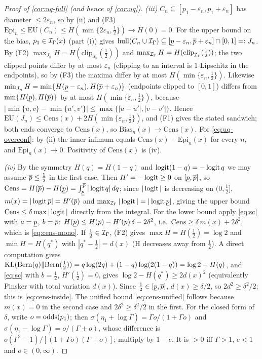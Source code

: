 \begin{proof}[Proof of \cref{cor:uq-full} (and hence of \cref{cor:uq})]
\emph{(iii)} $C_n\subseteq[p_1-\varepsilon_n,p_1+\varepsilon_n]$ has diameter
$\le2\varepsilon_n$, so by (ii) and (F3)
$\mathrm{Epi}_n\le\mathrm{EU}(C_n)\le H(\min\{2\varepsilon_n,\tfrac12\})\to H(0)=0$.
For the upper bound on the bias, $p_1\in\mathcal{I}_\Gamma(x)$ (part (i)) gives
$\mathrm{hull}(C_n\cup\mathcal{I}_\Gamma)\subseteq[\underline{p}-\varepsilon_n,\overline{p}+\varepsilon_n]\cap[0,1]=:J_n$.
By (F2) $\max_{J_n}H=H(\mathrm{clip}_{J_n}(\tfrac12))$ and
$\max_{\mathcal{I}_\Gamma}H=H(\mathrm{clip}_{\mathcal{I}_\Gamma}(\tfrac12))$; the two clipped points differ by
at most $\varepsilon_n$ (clipping to an interval is $1$-Lipschitz in the endpoints), so by
(F3) the maxima differ by at most $H(\min\{\varepsilon_n,\tfrac12\})$. Likewise
$\min_{J_n}H=\min\{H(\underline{p}-\varepsilon_n),H(\overline{p}+\varepsilon_n)\}$ (endpoints clipped to
$[0,1]$) differs from $\min\{H(\underline{p}),H(\overline{p})\}$ by at most $H(\min\{\varepsilon_n,\tfrac12\})$,
because $|\min\{u,v\}-\min\{u',v'\}|\le\max\{|u-u'|,|v-v'|\}$. Hence
$\mathrm{EU}(J_n)\le\mathrm{Cens}(x)+2H(\min\{\varepsilon_n,\tfrac12\})$, and (F1) gives the
stated sandwich; both ends converge to $\mathrm{Cens}(x)$, so
$\mathrm{Bias}_n(x)\to\mathrm{Cens}(x)$. For \eqref{eq:uq-overconf}: by (ii) the inner
infimum equals $\mathrm{Cens}(x)-\mathrm{Epi}_n(x)$ for every $n$, and
$\mathrm{Epi}_n(x)\to0$. Positivity of $\mathrm{Cens}(x)$ is (iv).

\emph{(iv)} By the symmetry $H(q)=H(1-q)$ and $\operatorname{logit}(1-q)=-\operatorname{logit} q$ we may assume
$\overline{p}\le\tfrac12$ in the first case. Then $H'=-\operatorname{logit}\ge0$ on $[\underline{p},\overline{p}]$, so
$\mathrm{Cens}=H(\overline{p})-H(\underline{p})=\int_{\underline{p}}^{\overline{p}}|\operatorname{logit} q|\,dq$; since $|\operatorname{logit}|$ is
decreasing on $(0,\tfrac12]$, $m(x)=|\operatorname{logit}\overline{p}|=H'(\overline{p})$ and
$\max_{\mathcal{I}_\Gamma}|\operatorname{logit}|=|\operatorname{logit}\underline{p}|$, giving the upper bound
$\mathrm{Cens}\le\delta\max|\operatorname{logit}|$ directly from the integral. For the lower bound apply
\eqref{eq:sc} with $a=\underline{p}$, $b=\overline{p}$:
$H(\underline{p})\le H(\overline{p})-H'(\overline{p})\,\delta-2\delta^2$, i.e.\
$\mathrm{Cens}\ge\delta\,m(x)+2\delta^2$, which is \eqref{eq:cens-mono}.
If $\tfrac12\in\mathcal{I}_\Gamma$, (F2) gives $\max H=H(\tfrac12)=\log2$ and
$\min H=H(q^\ast)$ with $|q^\ast-\tfrac12|=d(x)$ (H decreases away from $\tfrac12$). A direct
computation gives $\operatorname{KL}(\mathrm{Bern}(q)\|\mathrm{Bern}(\tfrac12))
=q\log(2q)+(1-q)\log(2(1-q))=\log2-H(q)$, and \eqref{eq:sc} with $b=\tfrac12$, $H'(\tfrac12)=0$,
gives $\log2-H(q^\ast)\ge2d(x)^2$ (equivalently Pinsker with total variation $d(x)$). Since
$\tfrac12\in[\underline{p},\overline{p}]$, $d(x)\ge\delta/2$, so $2d^2\ge\delta^2/2$; this is
\eqref{eq:cens-inside}. The unified bound \eqref{eq:cens-unified} follows because
$m(x)=0$ in the second case and $2\delta^2\ge\delta^2/2$ in the first. For the closed form
of $\delta$, write $o=\operatorname{odds}(p_1)$; then $\sigma(\eta_1+\log\Gamma)=\Gamma o/(1+\Gamma o)$
and $\sigma(\eta_1-\log\Gamma)=o/(\Gamma+o)$, whose difference is
$o(\Gamma^2-1)/[(1+\Gamma o)(\Gamma+o)]$; multiply by $1-e$. It is $>0$ iff $\Gamma>1$,
$e<1$ and $o\in(0,\infty)$.


\end{proof}
